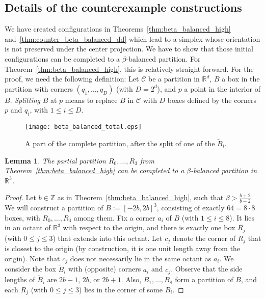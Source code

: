 \documentclass[12pt]{article}
\newcommand{\R}{\mathbb{R}}
\newcommand{\Z}{\mathbb{Z}}
\newcommand{\partition}{\mathcal{C}}
\newtheorem{lemma}[theorem]{Lemma}
\begin{document}
\begin{appendix}
\section{Details of the counterexample constructions}
\label{app:puzzle}

We have created configurations in Theorems~\ref{thm:beta_balanced_high}
and~\ref{thm:counter_beta_balanced_dd} which lead to a simplex whose orientation
is not preserved under the center projection. We have to show that those 
initial configurations can be completed to a $\beta$-balanced partition.
For Theorem~\ref{thm:beta_balanced_high}, this is relatively straight-forward.
For the proof, we need the following definition: 
Let $\partition$ be a partition in $\R^d$, $B$ a box in the partition with corners $(q_1,\ldots,q_D)$
(with $D=2^d$), 
and $p$ a point in the interior of $B$.
\emph{Splitting} $B$ at $p$ means to replace $B$ in $\partition$ with $D$ boxes defined by the corners
$p$ and $q_i$, with $1\leq i\leq D$.

\begin{figure}[hb]
\centering
\texttt{[image: beta\_balanced\_total.eps]}
\caption{A part of the complete partition, after the split of one of the $\tilde{B}_i$.}
\label{fig:completion}
\end{figure}

\begin{lemma}\label{lem:first_filling_lemma}
The partial partition $R_0,\ldots,R_3$ from Theorem~\ref{thm:beta_balanced_high}
can be completed to a $\beta$-balanced partition in $\R^3$.
\end{lemma}
\begin{proof}
Let $b\in\Z$ as in Theorem~\ref{thm:beta_balanced_high}, such that $\beta>\frac{b+2}{b-2}$.
We will construct a partition of $B:=[-2b,2b]^3$, consisting of exactly $64=8\cdot 8$ boxes, 
with $R_0,\ldots,R_3$ among them.
Fix a corner $a_i$ of $B$ (with $1\leq i\leq 8$). 
It lies in an octant of $\R^3$ with respect to the origin, and there
is exactly one box $R_j$ (with $0\leq j\leq 3$) that extends into this octant.
Let $c_j$ denote the corner of $R_j$ that is closest to the origin
(by construction, it is one unit length away from the origin).
Note that $c_j$ does not necessarily lie in the same octant as $a_i$.
We consider the box $\tilde{B}_i$ 
with (opposite) corners $a_i$ and $c_j$.
Observe that the side lengths of $\tilde{B}_i$ are $2b-1$, $2b$, or $2b+1$.
Also, $B_1,\ldots,B_8$ form a partition of $B$, and each $R_j$ (with $0\leq j\leq 3$)
lies in the corner of some $B_i$.


\end{proof}
\end{appendix}
\end{document}
